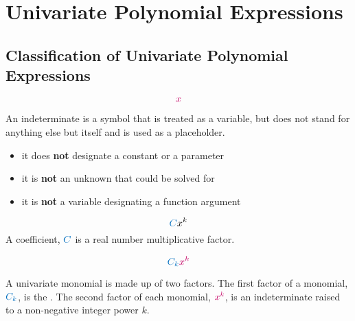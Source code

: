%
%


\chapter{Univariate Polynomial Expressions}

\section{Classification of Univariate Polynomial Expressions}

\begin{definition}[Indeterminate]

\[
\cRed{x}
\]	
	
An indeterminate is a symbol that is treated as a variable, but does not stand for anything else but itself and is used as a placeholder. 

\begin{itemize}
	\item it does \textbf{not} designate a constant or a parameter
	\item it is \textbf{not} an unknown that could be solved for
	\item it is \textbf{not} a variable designating a function argument
\end{itemize}

\hfill \cite{wikipediate:indeterminate}
\end{definition}


\begin{definition}[Coefficient]
\[	
	\cBlue{C}x^{k}
\]
A coefficient, $\cBlue{C}$ is a real number multiplicative factor.\\

\end{definition}

\begin{definition}

\[
 \cBlue{C_{k}}\cRed{x^{k}}
\]	
	
A univariate monomial is made up of two factors.  The first factor of a monomial, $\cBlue{C_{k}}$, is the . The second factor of each monomial, $\cRed{x^{k}}$, is an indeterminate raised to a non-negative integer power $k$. \\
 
\end{definition}

